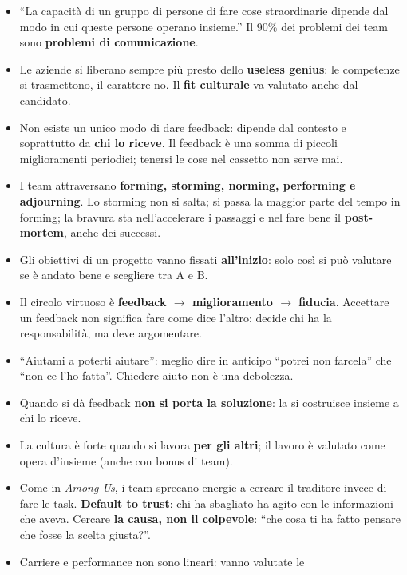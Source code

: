 \begin{itemize}
  \item ``La capacità di un gruppo di persone di fare cose straordinarie
        dipende dal modo in cui queste persone operano insieme.'' Il 90\% dei
        problemi dei team sono \textbf{problemi di comunicazione}.
  \item Le aziende si liberano sempre più presto dello \textbf{useless
        genius}: le competenze si trasmettono, il carattere no. Il
        \textbf{fit culturale} va valutato anche dal candidato.
  \item Non esiste un unico modo di dare feedback: dipende dal contesto e
        soprattutto da \textbf{chi lo riceve}. Il feedback è una somma di
        piccoli miglioramenti periodici; tenersi le cose nel cassetto non
        serve mai.
  \item I team attraversano \textbf{forming, storming, norming, performing e
        adjourning}. Lo storming non si salta; si passa la maggior parte del
        tempo in forming; la bravura sta nell'accelerare i passaggi e nel
        fare bene il \textbf{post-mortem}, anche dei successi.
  \item Gli obiettivi di un progetto vanno fissati \textbf{all'inizio}: solo
        così si può valutare se è andato bene e scegliere tra A e B.
  \item Il circolo virtuoso è \textbf{feedback $\rightarrow$ miglioramento
        $\rightarrow$ fiducia}. Accettare un feedback non significa fare come
        dice l'altro: decide chi ha la responsabilità, ma deve argomentare.
  \item ``Aiutami a poterti aiutare'': meglio dire in anticipo ``potrei non
        farcela'' che ``non ce l'ho fatta''. Chiedere aiuto non è una
        debolezza.
  \item Quando si dà feedback \textbf{non si porta la soluzione}: la si
        costruisce insieme a chi lo riceve.
  \item La cultura è forte quando si lavora \textbf{per gli altri}; il lavoro
        è valutato come opera d'insieme (anche con bonus di team).
  \item Come in \emph{Among Us}, i team sprecano energie a cercare il
        traditore invece di fare le task. \textbf{Default to trust}: chi ha
        sbagliato ha agito con le informazioni che aveva. Cercare
        \textbf{la causa, non il colpevole}: ``che cosa ti ha fatto pensare
        che fosse la scelta giusta?''.
  \item Carriere e performance non sono lineari: vanno valutate le

\end{itemize}

